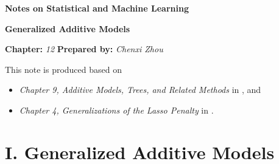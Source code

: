 \documentclass[12pt]{article}
\newcommand{\titlebox}[4]{
\begin{tcolorbox}[colback = blue!5!white!95, colframe = blue!70!black
]
  \noindent \textbf{ #1 } \hfill \textit{#2} 
  \begin{center}
  	 \LARGE{\textbf{#3}}
  \end{center}
\textbf{Chapter:} \textit{#4} \hfill \textbf{Prepared by:} \textit{Chenxi Zhou}
\end{tcolorbox}
}
\begin{document}
\titlebox{Notes on Statistical and Machine Learning}{}{Generalized Additive Models}{12}
\thispagestyle{plain}

\vspace{10pt}

This note is produced based on 
\begin{itemize}
	\item \textit{Chapter 9, Additive Models, Trees, and Related Methods} in \textcite{Friedman2001-np}, and 
	\item \textit{Chapter 4, Generalizations of the Lasso Penalty} in \textcite{Hastie2015-rm}. 
\end{itemize}


\section*{I. Generalized Additive Models} 
\end{document}
